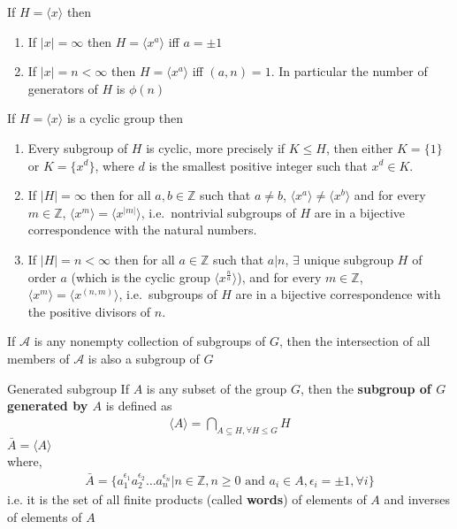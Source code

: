 \documentclass[titlepage, 12pt]{article}
\begin{document}
\begin{proposition}{}{}
    If $H = \langle x\rangle$ then
        \begin{enumerate}
            \item If $|x| = \infty$ then $H = \langle x^a\rangle$ iff $a =
                \pm 1$
            \item If $|x| = n < \infty$ then $H = \langle x^a\rangle$ iff $(a, n) =
                1$. In particular the number of generators of $H$ is $\phi(n)$
        \end{enumerate}
\end{proposition}
\begin{proposition}{}{}
    If $H = \langle x\rangle$ is a cyclic group then
        \begin{enumerate}
            \item Every subgroup of $H$ is cyclic, more precisely if $K\le H$,
                then either $K = \{1\}$ or $K = \{x^d\}$, where $d$ is the
                smallest positive integer such that $x^d\in K$.
            \item If $|H| = \infty$ then for all $a, b\in\mathbb{Z}$ such that
                $a\neq b$, $\langle x^a\rangle\neq\langle x^b\rangle$ and for
                every $m\in\mathbb{Z}$, $\langle x^m\rangle = \langle
                x^{|m|}\rangle$, i.e.\ nontrivial subgroups of $H$ are in a
                bijective correspondence with the natural numbers.
            \item If $|H| = n < \infty$ then for all $a\in\mathbb{Z}$ such that
                $a|n$, $\exists$ unique subgroup $H$ of order $a$ (which is the
                cyclic group $\langle x^{\frac{n}{a}}\rangle$), and for every
                $m\in\mathbb{Z}$, $\langle x^m\rangle = \langle x^{(n,
                m)}\rangle$, i.e.\ subgroups of $H$ are in a bijective
                correspondence with the positive divisors of $n$.
        \end{enumerate}
\end{proposition}
\begin{proposition}{}{}
    If $\mathcal{A}$ is any nonempty collection of subgroups of $G$, then
        the intersection of all members of $\mathcal{A}$ is also a subgroup of
        $G$
\end{proposition}
\begin{definition}{Generated subgroup}{}
    If $A$ is any subset of the group $G$, then the \textbf{subgroup of
        $G$ generated by $A$} is defined as
        \begin{gather*}
            \langle A\rangle = \bigcap_{A\subseteq H,\forall H\le G}H
        \end{gather*}
    $\bar{A} = \langle A\rangle$\\
        where,
        \begin{gather*}
            \bar{A} = \{a_1^{\epsilon_1}a_2^{\epsilon_2}\dots
                a_n^{\epsilon_n}|n\in\mathbb{Z}, n\ge 0\textrm{ and } a_i\in A,
            \epsilon_i = \pm 1, \forall i\}
        \end{gather*}
        i.e. it is the set of all finite products (called \textbf{words}) of
        elements of $A$ and inverses of elements of $A$
\end{definition}
\end{document}
